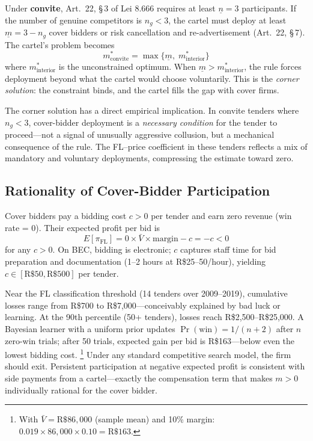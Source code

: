 Under \textbf{convite}, Art.\ 22, \S\,3 of Lei 8.666 requires at
least $\underline{n} = 3$ participants. If the number of genuine
competitors is $n_g < 3$, the cartel must deploy at least
$\underline{m} = 3 - n_g$ cover bidders or risk cancellation and
re-advertisement (Art.\ 22, \S\,7). The cartel's problem becomes
\begin{equation}
  m^*_{\text{convite}} = \max\bigl\{\underline{m},\; m^*_{\text{interior}}\bigr\}
  \label{eq:corner}
\end{equation}
where $m^*_{\text{interior}}$ is the unconstrained optimum. When
$\underline{m} > m^*_{\text{interior}}$, the rule forces deployment
beyond what the cartel would choose voluntarily. This is the
\emph{corner solution}: the constraint binds, and the cartel fills
the gap with cover firms.

The corner solution has a direct empirical implication. In convite
tenders where $n_g < 3$, cover-bidder deployment is a \emph{necessary
condition} for the tender to proceed---not a signal of unusually
aggressive collusion, but a mechanical consequence of the rule. The
FL--price coefficient in these tenders reflects a mix of mandatory
and voluntary deployments, compressing the estimate toward zero.

\subsection{Rationality of Cover-Bidder Participation}
\label{sec:rationality}

Cover bidders pay a bidding cost $c > 0$ per tender and earn zero
revenue (win rate = 0). Their expected profit per bid is
\begin{equation}
  E[\pi_{\text{FL}}] = 0 \times \bar{V} \times \text{margin} - c = -c < 0
  \label{eq:fl_profit}
\end{equation}
for any $c > 0$. On BEC, bidding is electronic; $c$ captures staff
time for bid preparation and documentation (1--2 hours at
R\$25--50/hour), yielding $c \in [\text{R\$50}, \text{R\$500}]$ per
tender.

Near the FL classification threshold (14 tenders over 2009--2019),
cumulative losses range from R\$700 to R\$7,000---conceivably
explained by bad luck or learning. At the 90th percentile (50+
tenders), losses reach R\$2,500--R\$25,000. A Bayesian learner with
a uniform prior updates $\Pr(\text{win}) = 1/(n+2)$ after $n$
zero-win trials; after 50 trials, expected gain per bid is
R\$163---below even the lowest bidding cost.%
\footnote{With $\bar{V} = \text{R\$}86{,}000$ (sample mean) and
10\% margin: $0.019 \times 86{,}000 \times 0.10 = \text{R\$}163$.}
Under any standard competitive search model, the firm should exit.
Persistent participation at negative expected profit is consistent
with side payments from a cartel---exactly the compensation term
that makes $m > 0$ individually rational for the cover bidder.

